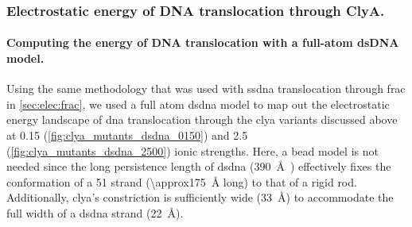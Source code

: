 %
\subsubsection{Electrostatic energy of DNA translocation through ClyA.}
%
\label{sec:elec:clya:dna}

\paragraph{Computing the energy of DNA translocation with a full-atom dsDNA model.}
%
Using the same methodology that was used with \gls{ssdna} translocation through \gls{frac} in
\cref{sec:elec:frac}, we used a full atom \gls{dsdna} model to map out the electrostatic energy landscape of
\gls{dna} translocation through the \gls{clya} variants discussed above at \SI{0.15}{\Molar}
(\cref{fig:clya_mutants_dsdna_0150}) and \SI{2.5}{\Molar} (\cref{fig:clya_mutants_dsdna_2500}) ionic
strengths. Here, a bead model is not needed since the long persistence length of \gls{dsdna}
(\SI{390}{\angstrom}~\cite{Gross-2011}) effectively fixes the conformation of a \SI{51}{\bp} strand
(\SI{\approx175}{\angstrom} long) to that of a rigid rod. Additionally, \gls{clya}'s \transi{} constriction is
sufficiently wide (\SI{33}{\angstrom}) to accommodate the full width of a \gls{dsdna} strand
(\SI{22}{\angstrom}).


